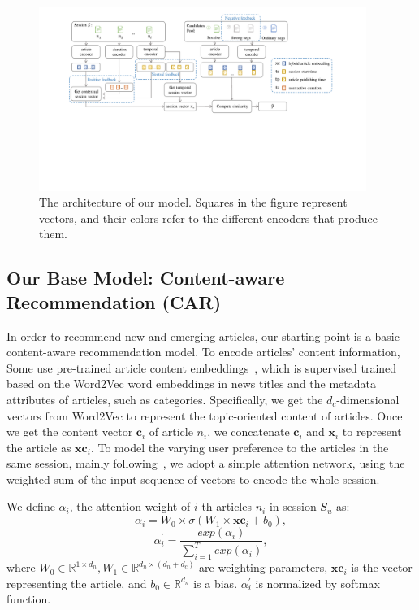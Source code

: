 \begin{figure}[th]
    \centering
    \includegraphics[width=0.95\textwidth]{fig/architecture.pdf}
    \caption{The architecture of our model. Squares in the figure represent
vectors, and their colors refer to the different encoders that produce them.}
    \label{fig:arch}
\end{figure}

\subsection{Our Base Model: Content-aware Recommendation (CAR)}
\label{sec: base}
In order to recommend new and emerging articles,
our starting point is a basic content-aware recommendation model. 
To encode articles' content information, 
Some use pre-trained article content embeddings~\cite{gabriel2019contextual}, 
which is supervised trained based on the Word2Vec word embeddings in news titles and the metadata attributes of articles, such as categories.
Specifically, we get the $d_c$-dimensional vectors from Word2Vec to represent the 
topic-oriented content of articles. Once we get the content vector $\mathbf{c}_i$ of 
article $n_i$, we concatenate $\mathbf{c}_i$ and $\mathbf{x}_i$ to represent 
the article as $\mathbf{xc}_i$. 
To model the varying user preference to the articles in the same session, mainly following~\cite{liu2018stamp}, we adopt a simple attention network, using the weighted sum of the input sequence of vectors to encode the whole session.

We define $\alpha_i$, the attention weight of $i$-th articles $n_i$ in session $S_u$ as:
\begin{equation}
    \label{eq:alpha}
    \alpha_i = W_0 \times \sigma (W_1 \times \mathbf{xc}_i +  b_0),
\end{equation}
\begin{equation}
    \alpha_i^{\prime} = \frac{exp(\alpha_i)}{\sum_{i=1}^T exp(\alpha_i)},
\end{equation}
where $W_0\in \mathbb{R}^{1 \times d_n}, W_1 \in \mathbb{R}^{d_n\times (d_n+d_c)}$ 
are weighting parameters, $\mathbf{xc}_i$ is the vector representing the article, 
and $b_0\in \mathbb{R}^{d_n}$ is a bias. $\alpha_i^{\prime}$ is normalized by softmax function.

